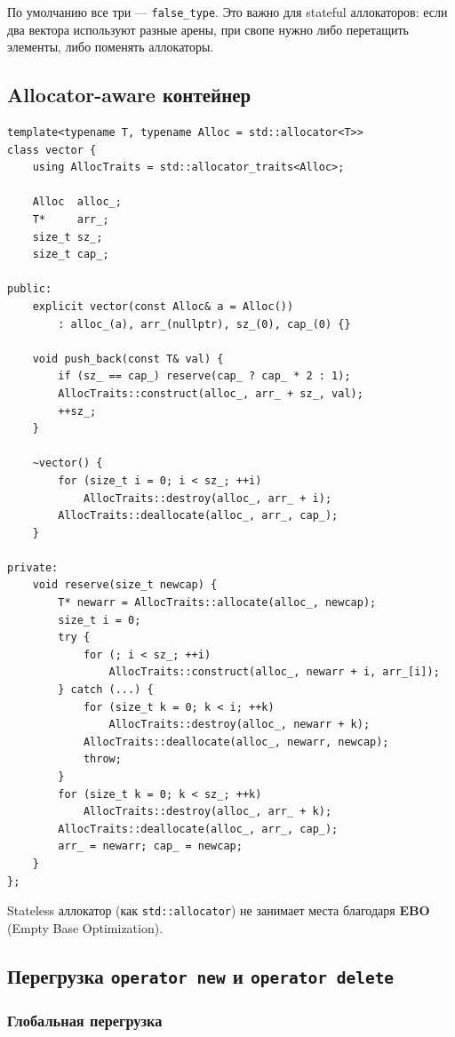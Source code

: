 \documentclass[a4paper,12pt]{article}
\begin{document}
По умолчанию все три --- \texttt{false\_type}. Это важно для stateful
аллокаторов: если два вектора используют разные арены, при свопе нужно
либо перетащить элементы, либо поменять аллокаторы.

\subsection{Allocator-aware контейнер}

\begin{lstlisting}
template<typename T, typename Alloc = std::allocator<T>>
class vector {
    using AllocTraits = std::allocator_traits<Alloc>;

    Alloc  alloc_;
    T*     arr_;
    size_t sz_;
    size_t cap_;

public:
    explicit vector(const Alloc& a = Alloc())
        : alloc_(a), arr_(nullptr), sz_(0), cap_(0) {}

    void push_back(const T& val) {
        if (sz_ == cap_) reserve(cap_ ? cap_ * 2 : 1);
        AllocTraits::construct(alloc_, arr_ + sz_, val);
        ++sz_;
    }

    ~vector() {
        for (size_t i = 0; i < sz_; ++i)
            AllocTraits::destroy(alloc_, arr_ + i);
        AllocTraits::deallocate(alloc_, arr_, cap_);
    }

private:
    void reserve(size_t newcap) {
        T* newarr = AllocTraits::allocate(alloc_, newcap);
        size_t i = 0;
        try {
            for (; i < sz_; ++i)
                AllocTraits::construct(alloc_, newarr + i, arr_[i]);
        } catch (...) {
            for (size_t k = 0; k < i; ++k)
                AllocTraits::destroy(alloc_, newarr + k);
            AllocTraits::deallocate(alloc_, newarr, newcap);
            throw;
        }
        for (size_t k = 0; k < sz_; ++k)
            AllocTraits::destroy(alloc_, arr_ + k);
        AllocTraits::deallocate(alloc_, arr_, cap_);
        arr_ = newarr; cap_ = newcap;
    }
};
\end{lstlisting}

Stateless аллокатор (как \texttt{std::allocator}) не занимает места
благодаря \textbf{EBO} (Empty Base Optimization).

\subsection{Перегрузка \texttt{operator new} и \texttt{operator delete}}

\subsubsection{Глобальная перегрузка}
\end{document}
